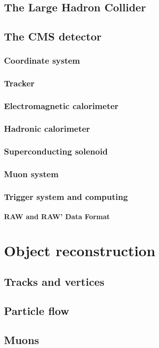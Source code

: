 \documentclass[11pt, a4paper, twoside]{report}
\begin{document}
\section{The Large Hadron Collider}
\section{The CMS detector}
\subsection{Coordinate system}
\subsection{Tracker}
\subsection{Electromagnetic calorimeter}
\subsection{Hadronic calorimeter}
\subsection{Superconducting solenoid}
\subsection{Muon system}
\subsection{Trigger system and computing}
\subsubsection{RAW and RAW' Data Format}

\chapter{Object reconstruction}
\section{Tracks and vertices}
\section{Particle flow}
\section{Muons}
\end{document}
